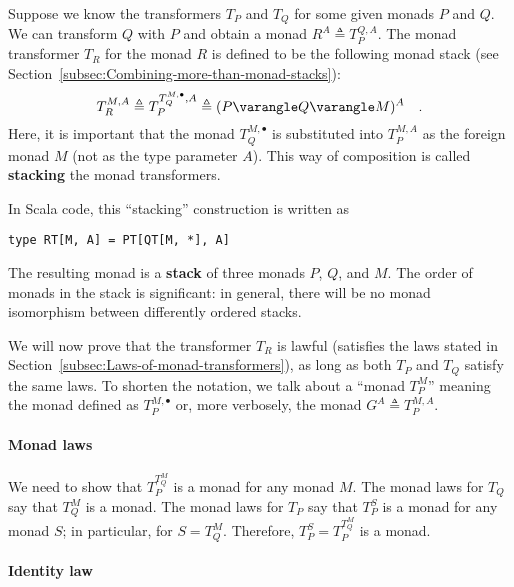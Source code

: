 Suppose we know the transformers $T_{P}$ and $T_{Q}$ for some given
monads $P$ and $Q$. We can transform $Q$ with $P$ and obtain a
monad $R^{A}\triangleq T_{P}^{Q,A}$. The monad transformer $T_{R}$
for the monad $R$ is defined to be the following monad stack (see
Section~\ref{subsec:Combining-more-than-monad-stacks}):
\[
T_{R}^{M,A}\triangleq T_{P}^{T_{Q}^{M,\bullet},A}\triangleq(P\varangle Q\varangle M)^{A}\quad.
\]
Here, it is important that the monad $T_{Q}^{M,\bullet}$ is substituted
into $T_{P}^{M,A}$ as the foreign monad $M$ (not as the type parameter
$A$). This way of composition is called \textbf{stacking}
the monad transformers. 

In Scala code, this \textsf{``}stacking\textsf{''} construction is written as
\begin{lstlisting}
type RT[M, A] = PT[QT[M, *], A]
\end{lstlisting}
The resulting monad is a \textbf{stack} of
three monads $P$, $Q$, and $M$. The order of monads in the stack
is significant: in general, there will be no monad isomorphism between
differently ordered stacks.

We will now prove that the transformer $T_{R}$ is lawful (satisfies
the laws stated in Section~\ref{subsec:Laws-of-monad-transformers}),
as long as both $T_{P}$ and $T_{Q}$ satisfy the same laws. To shorten
the notation, we talk about a \textsf{``}monad $T_{P}^{M}$\textsf{''} meaning the
monad defined as $T_{P}^{M,\bullet}$ or, more verbosely, the monad
$G^{A}\triangleq T_{P}^{M,A}$.

\paragraph{Monad laws}

We need to show that $T_{P}^{T_{Q}^{M}}$ is a monad for any monad
$M$. The monad laws for $T_{Q}$ say that $T_{Q}^{M}$ is a monad.
The monad laws for $T_{P}$ say that $T_{P}^{S}$ is a monad for any
monad $S$; in particular, for $S=T_{Q}^{M}$. Therefore, $T_{P}^{S}=T_{P}^{T_{Q}^{M}}$
is a monad.

\paragraph{Identity law}

